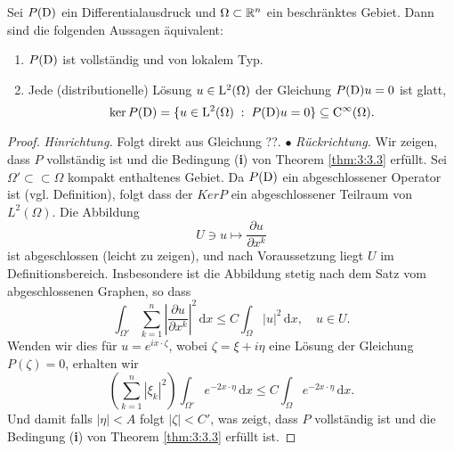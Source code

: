 %
%
%
%

\begin{thm}
Sei $P(\mathrm D)$ ein Differentialausdruck und $\Omega\subset\mathbb R^n$ ein beschränktes Gebiet. Dann sind die folgenden Aussagen äquivalent:
\begin{enumerate}
\item $P(\mathrm D)$ ist vollständig und von lokalem Typ.
\item Jede (distributionelle) Lösung $u\in\mathrm L^2(\Omega)$ der Gleichung $P(\mathrm D)u=0$ ist glatt,
\begin{equation}
    \ker P(\mathrm D) = \{ u\in\mathrm L^2(\Omega) \;:\; P(\mathrm D)u=0\} \subseteq\mathrm C^\infty(\Omega).
\end{equation}
\end{enumerate}
\end{thm}
\begin{proof}
\emph{Hinrichtung.} Folgt direkt aus Gleichung ??. $\bullet$ \qquad
\emph{Rückrichtung.} Wir zeigen, dass $P$ vollständig ist und die Bedingung ({\bf i}) von Theorem \ref{thm:3:3.3} erfüllt.   Sei $\Omega'\subset\subset \Omega$ kompakt enthaltenes Gebiet. Da $P(\mathrm D)$ ein abgeschlossener Operator ist (vgl. Definition), folgt dass der $Ker P$ ein abgeschlossener Teilraum von $L^2(\Omega)$. Die Abbildung
\begin{equation}
U\ni u \mapsto \frac{\partial u}{\partial x^k}
\end{equation}  
ist abgeschlossen (leicht zu zeigen), und nach Voraussetzung liegt $U$ im Definitionsbereich.  Insbesondere ist die Abbildung stetig nach dem Satz vom abgeschlossenen Graphen, so dass
\begin{equation}
\int_{\Omega'} \sum_{k=1}^n \left | \frac{\partial u}{\partial x^k}\right |^2\, \mathrm dx \le C \int_\Omega |u|^2\, \mathrm dx, \quad u\in U.
\end{equation}
Wenden wir dies für $u=e^{ix\cdot \zeta}$, wobei $\zeta = \xi + i \eta$ eine Lösung der Gleichung $P(\zeta)=0$, erhalten wir
\begin{equation}
\left (\sum_{k=1}^n |\xi_k|^2 \right ) \int_{\Omega'} e^{-2x\cdot \eta}\, \mathrm dx \le C\int_\Omega e^{-2 x\cdot \eta}\, \mathrm dx.
\end{equation}
Und damit falls  $|\eta|<A$ folgt $|\zeta|<C'$, was zeigt, dass $P$ vollständig ist und die Bedingung ({\bf i}) von Theorem \ref{thm:3:3.3} erfüllt ist.
\end{proof}